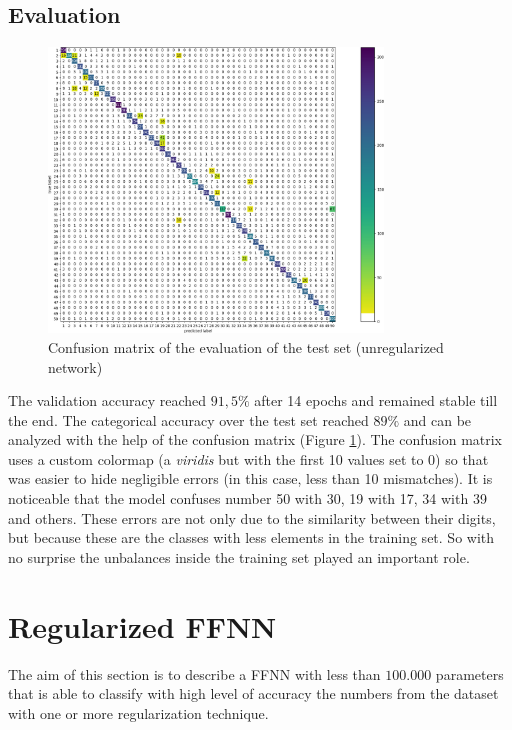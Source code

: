 \documentclass[compsoc]{IEEEtran}
\begin{document}
\subsection{Evaluation}
\begin{figure}[ht!]
\centering                                                                        
\includegraphics[width=3.5in]{noregcm.png}
\captionsetup{justification=centering}                                                                                                                                   
\caption{Confusion matrix of the evaluation of the test set (unregularized network)}
\label{fig:noregcm}                                                                                                                                                           
\end{figure}
The validation accuracy reached $91,5\%$ after 14 epochs and remained stable till the end. The categorical accuracy 
over the test set reached $89\%$ and can be analyzed with the help of the confusion matrix (Figure \ref{fig:noregcm}). 
The confusion matrix uses a custom colormap (a \emph{viridis} but with the first 10 values set to 0) so that was easier
to hide negligible errors (in this case, less than 10 mismatches). It is noticeable that the model confuses number 50 with 30,
19 with 17, 34 with 39 and others. These errors are not only due to the similarity between their digits, but because
these are the classes with less elements in the training set. So with no surprise the unbalances inside the training set played an
important role.

\par





\section{Regularized FFNN}
The aim of this section is to describe a FFNN with less than $100.000$ parameters that is able to classify
with high level of accuracy the numbers from the dataset with one or more regularization technique. 
\end{document}
